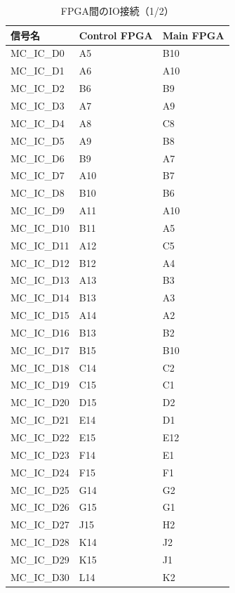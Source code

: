 \documentclass[dvipdfmx]{jlreq}
\begin{document}
\begin{table}[htbp]
  \centering
  \small
  \renewcommand{\arraystretch}{0.9}
  \begin{minipage}[t]{0.48\textwidth}
    \centering
    \caption{FPGA間のIO接続（1/2）}
    \label{tab:interconnect1}
    \begin{tabular}{|l|l|l|} \hline
       信号名 & Control FPGA & Main FPGA \\ \hline \hline
    MC\_IC\_D0 & A5 & B10 \\
    MC\_IC\_D1 & A6 & A10 \\
    MC\_IC\_D2 & B6 & B9 \\
    MC\_IC\_D3 & A7 & A9 \\
    MC\_IC\_D4 & A8 & C8 \\
    MC\_IC\_D5 & A9 & B8 \\
    MC\_IC\_D6 & B9 & A7 \\
    MC\_IC\_D7 & A10 & B7 \\
    MC\_IC\_D8 & B10 & B6 \\
    MC\_IC\_D9 & A11 & A10 \\
    MC\_IC\_D10 & B11 & A5 \\
    MC\_IC\_D11 & A12 & C5 \\
    MC\_IC\_D12 & B12 & A4 \\
    MC\_IC\_D13 & A13 & B3 \\
    MC\_IC\_D14 & B13 & A3 \\
    MC\_IC\_D15 & A14 & A2 \\
    MC\_IC\_D16 & B13 & B2 \\
    MC\_IC\_D17 & B15 & B10 \\
    MC\_IC\_D18 & C14 & C2 \\
    MC\_IC\_D19 & C15 & C1 \\
    MC\_IC\_D20 & D15 & D2 \\
    MC\_IC\_D21 & E14 & D1 \\
    MC\_IC\_D22 & E15 & E12 \\
    MC\_IC\_D23 & F14 & E1 \\
    MC\_IC\_D24 & F15 & F1 \\
    MC\_IC\_D25 & G14 & G2 \\
    MC\_IC\_D26 & G15 & G1 \\
    MC\_IC\_D27 & J15 & H2 \\
    MC\_IC\_D28 & K14 & J2 \\
    MC\_IC\_D29 & K15 & J1 \\
    MC\_IC\_D30 & L14 & K2 \\ \hline

\end{tabular}
\end{minipage}
\end{table}
\end{document}
